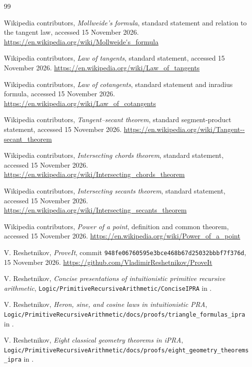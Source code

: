 \documentclass[11pt,letterpaper]{article}
\theoremstyle{definition}
\theoremstyle{remark}
\newcommand{\code}[1]{\texttt{#1}}
\begin{document}
\begin{thebibliography}{99}

Wikipedia contributors,
\emph{Mollweide's formula}, standard statement and relation to the tangent law,
accessed 15 November 2026.
\url{https://en.wikipedia.org/wiki/Mollweide's_formula}

Wikipedia contributors,
\emph{Law of tangents}, standard statement,
accessed 15 November 2026.
\url{https://en.wikipedia.org/wiki/Law_of_tangents}

Wikipedia contributors,
\emph{Law of cotangents}, standard statement and inradius formula,
accessed 15 November 2026.
\url{https://en.wikipedia.org/wiki/Law_of_cotangents}

Wikipedia contributors,
\emph{Tangent--secant theorem}, standard segment-product statement,
accessed 15 November 2026.
\url{https://en.wikipedia.org/wiki/Tangent--secant_theorem}

Wikipedia contributors,
\emph{Intersecting chords theorem}, standard statement,
accessed 15 November 2026.
\url{https://en.wikipedia.org/wiki/Intersecting_chords_theorem}

Wikipedia contributors,
\emph{Intersecting secants theorem}, standard statement,
accessed 15 November 2026.
\url{https://en.wikipedia.org/wiki/Intersecting_secants_theorem}

Wikipedia contributors,
\emph{Power of a point}, definition and common theorem,
accessed 15 November 2026.
\url{https://en.wikipedia.org/wiki/Power_of_a_point}

V. Reshetnikov,
\emph{ProveIt}, commit
\code{948fe06760595e3bce468b67d25032bbbf7f376d}, 15 November 2026.
\url{https://github.com/VladimirReshetnikov/ProveIt}

V. Reshetnikov,
\emph{Concise presentations of intuitionistic primitive recursive arithmetic},
\code{Logic/PrimitiveRecursiveArithmetic/ConciseIPRA} in \cite{proveit}.

V. Reshetnikov,
\emph{Heron, sine, and cosine laws in intuitionistic PRA},
\code{Logic/PrimitiveRecursiveArithmetic/docs/proofs/triangle\_formulas\_ipra}
in \cite{proveit}.

V. Reshetnikov,
\emph{Eight classical geometry theorems in iPRA},
\code{Logic/PrimitiveRecursiveArithmetic/docs/proofs/eight\_geometry\_theorems\_ipra}
in \cite{proveit}.

\end{thebibliography}
\end{document}
